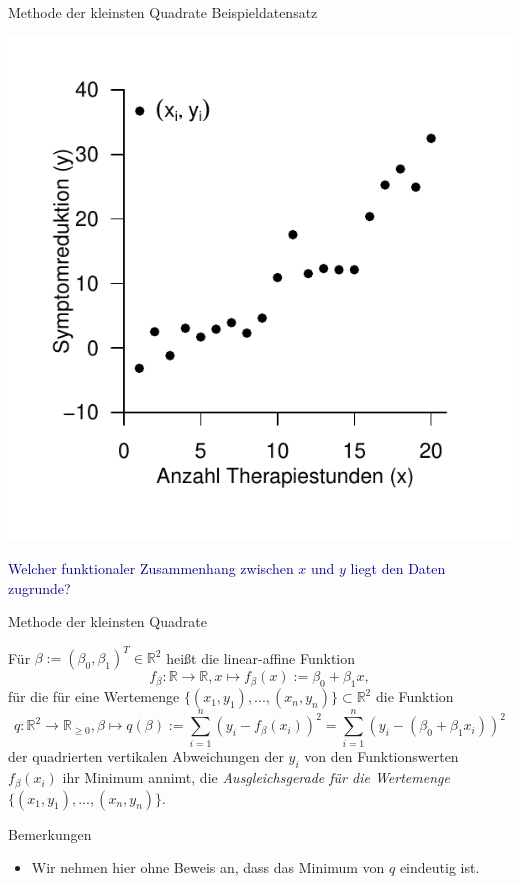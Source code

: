 \documentclass[
  8pt,
  ignorenonframetext,
]{beamer}
\providecommand{\tightlist}{%
  \setlength{\itemsep}{0pt}\setlength{\parskip}{0pt}}
\begin{document}
\begin{frame}{Methode der kleinsten Quadrate}
\protect\hypertarget{methode-der-kleinsten-quadrate-2}{}
Beispieldatensatz

\begin{center}\includegraphics[width=0.55\linewidth]{1_Abbildungen/alm_1_beispieldatensatz} \end{center}

\center

\textcolor{darkblue}{Welcher funktionaler Zusammenhang zwischen $x$ und $y$ liegt den Daten zugrunde?}
\end{frame}

\begin{frame}{Methode der kleinsten Quadrate}
\protect\hypertarget{methode-der-kleinsten-quadrate-3}{}
\footnotesize
\begin{definition}[Ausgleichsgerade]
\justifying
Für $\beta := (\beta_0,\beta_1)^T \in \mathbb{R}^2$ heißt die linear-affine Funktion
\begin{equation}
f_\beta : \mathbb{R} \to \mathbb{R}, x \mapsto f_\beta(x) := \beta_0 + \beta_1 x,
\end{equation}
für die für eine Wertemenge  $\{(x_1,y_1),...,(x_n,y_n)\} \subset \mathbb{R}^2$ die Funktion
\begin{equation}
q : \mathbb{R}^2 \to \mathbb{R}_{\ge 0}, \beta \mapsto q(\beta)
:= \sum_{i=1}^n (y_i-f_\beta(x_i))^2
 = \sum_{i=1}^n (y_i- (\beta_0 + \beta_1x_i))^2
\end{equation}
der quadrierten vertikalen Abweichungen der $y_i$ von den Funktionswerten $f_{\beta}(x_i)$
ihr Minimum annimt, die \textit{Ausgleichsgerade für die Wertemenge $\{(x_1,y_1),...,(x_n,y_n)\}$}.
\end{definition}

Bemerkungen

\begin{itemize}
\tightlist
\item
  Wir nehmen hier ohne Beweis an, dass das Minimum von \(q\) eindeutig
  ist.
\end{itemize}
\end{frame}
\end{document}
